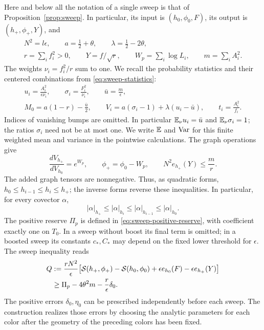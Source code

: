 Here and below all the notation of a single sweep is that of
Proposition~\ref{prop:sweep}.  In particular, its input is
\((h_0,\phi_0,F)\), its output is \((h_+,\phi_+,Y)\), and
\[
\begin{gathered}
 N^2=l\epsilon,\qquad a=\tfrac12+\theta,\qquad
 \lambda=\tfrac12-2\theta,\\
 r=\sum_i f_i^2>0,\qquad Y=f/\sqrt r,\qquad
 W_p=\sum_i\log L_i,\qquad m=\sum_i A_i^2.
\end{gathered}
\]
The weights \(\nu_i=f_i^2/r\) sum to one.  We recall the probability
statistics and their centered combinations from
\eqref{eq:sweep-statistics}:
\[
\begin{gathered}
 u_i=\frac{A_i^2}{\epsilon\nu_i},\qquad
 \sigma_i=\frac{F_i^2}{\nu_i},\qquad
 \bar u=\frac m\epsilon,\\
 M_0=a(1-r)-\frac{\bar u}{2},\qquad
 V_i=a(\sigma_i-1)+\lambda(u_i-\bar u),\qquad
 t_i=\frac{A_i^2}{f_i}.
\end{gathered}
\]
Indices of vanishing bumps are omitted.  In particular
\(\mathbb E_\nu u_i=\bar u\) and \(\mathbb E_\nu\sigma_i=1\); the ratios \(\sigma_i\)
need not be at most one.  We write \(\mathbb E\) and \(\operatorname{Var}\) for
this finite weighted mean and variance in the pointwise calculations.
The graph operations give
\begin{equation}\label{eq:entropy-sweep-density}
 \frac{dV_{h_+}}{dV_{h_0}}=e^{W_p},\qquad
 \phi_+=\phi_0-W_p,\qquad
 N^2 e_{h_+}(Y)\leq \frac mr.
\end{equation}
The added graph tensors are nonnegative.  Thus, as quadratic forms,
\(h_0\leq h_{i-1}\leq h_i\leq h_+\); the inverse forms reverse these
inequalities.  In particular, for every covector \(\alpha\),
\[
 |\alpha|_{h_+}\leq|\alpha|_{h_i}
       \leq|\alpha|_{h_{i-1}}\leq|\alpha|_{h_0}.
\]
The positive reserve \(\Pi_p\) is defined in
\eqref{eq:sweep-positive-reserve}, with coefficient exactly one on
\(T_0\).  In a sweep without boost its final term is omitted; in a
boosted sweep its constants \(c_*,C_*\) may depend on the fixed lower
threshold for \(\epsilon\).  The sweep inequality reads
\begin{equation}\label{eq:entropy-sweep-form}
\begin{split}
 Q&:=\frac{rN^2}{\epsilon}
 \bigl[\mathcal S(h_+,\phi_+)-\mathcal S(h_0,\phi_0)
        +\epsilon e_{h_0}(F)-\epsilon e_{h_+}(Y)\bigr]\\
 &\geq \Pi_p-4\theta^2m-\frac r\epsilon\delta_0 .
\end{split}
\end{equation}
The positive errors \(\delta_0,\eta_0\) can be prescribed independently
before each sweep.  The construction realizes those errors by choosing
the analytic parameters for each color after the geometry of the
preceding colors has been fixed.

